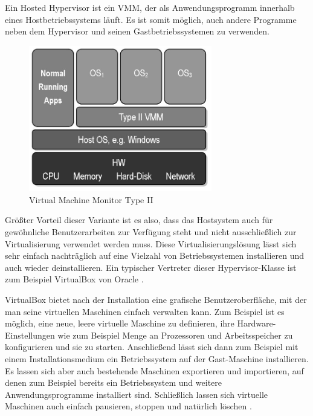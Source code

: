 
Ein Hosted Hypervisor ist ein \ac{VMM}, der als Anwendungsprogramm innerhalb eines Hostbetriebssystems läuft. Es ist somit möglich, auch andere Programme neben dem Hypervisor und seinen Gastbetriebssystemen zu verwenden.

\begin{figure}[!ht]
  \begin{center}
    \includegraphics[width=8cm]{bilder/VMM-Type2.jpg}
    \caption{Virtual Machine Monitor Type II \citep{wiki:003}}
  \end{center}
\end{figure}

Größter Vorteil dieser Variante ist es also, dass das Hostsystem auch für gewöhnliche Benutzerarbeiten zur Verfügung steht und nicht ausschließlich zur Virtualisierung verwendet werden muss. Diese Virtualisierungslösung lässt sich sehr einfach nachträglich auf eine Vielzahl von Betriebssystemen installieren und auch wieder deinstallieren. Ein typischer Vertreter dieser Hypervisor-Klasse ist zum Beispiel VirtualBox von Oracle \citep[Vgl.][S. 24]{DamMohAnd12}.

VirtualBox bietet nach der Installation eine grafische Benutzeroberfläche, mit der man seine virtuellen Maschinen einfach verwalten kann. Zum Beispiel ist es möglich, eine neue, leere virtuelle Maschine zu definieren, ihre Hardware-Einstellungen wie zum Beispiel Menge an Prozessoren und Arbeitsspeicher zu konfigurieren und sie zu starten. Anschließend lässt sich dann zum Beispiel mit einem Installationsmedium ein Betriebssystem auf der Gast-Maschine installieren. Es lassen sich aber auch bestehende Maschinen exportieren und importieren, auf denen zum Beispiel bereits ein Betriebssystem und weitere Anwendungsprogramme installiert sind. Schließlich lassen sich virtuelle Maschinen auch einfach pausieren, stoppen und natürlich löschen \citep[Vgl.][S. 11 ff.]{Oracle14}.

